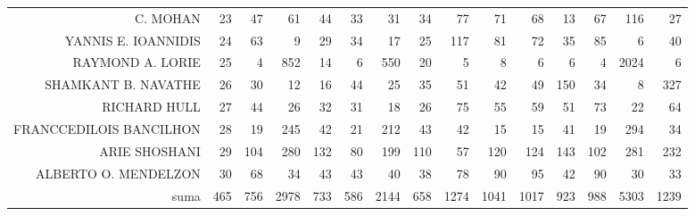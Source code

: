 \documentclass{bakalarka}
\begin{document}
\begin{table}[!ht]
\begin{sideways}
\begin{scriptsize}
\begin{tabular}{r|r|rrrrrrrrrrrrr}
C. MOHAN&23&47&61&44&33&31&34&77&71&68&13&67&116&27\\
YANNIS E. IOANNIDIS&24&63&9&29&34&17&25&117&81&72&35&85&6&40\\
RAYMOND A. LORIE&25&4&852&14&6&550&20&5&8&6&6&4&2024&6\\
SHAMKANT B. NAVATHE&26&30&12&16&44&25&35&51&42&49&150&34&8&327\\
RICHARD HULL&27&44&26&32&31&18&26&75&55&59&51&73&22&64\\
FRANCCEDILOIS BANCILHON&28&19&245&42&21&212&43&42&15&15&41&19&294&34\\
ARIE SHOSHANI&29&104&280&132&80&199&110&57&120&124&143&102&281&232\\
ALBERTO O. MENDELZON&30&68&34&43&43&40&38&78&90&95&42&90&30&33\\
\midrule
suma&465&756&2978&733&586&2144&658&1274&1041&1017&923&988&5303&1239\\
\bottomrule
\end{tabular}
\end{scriptsize}
\end{sideways}
\end{table}
\end{document}
